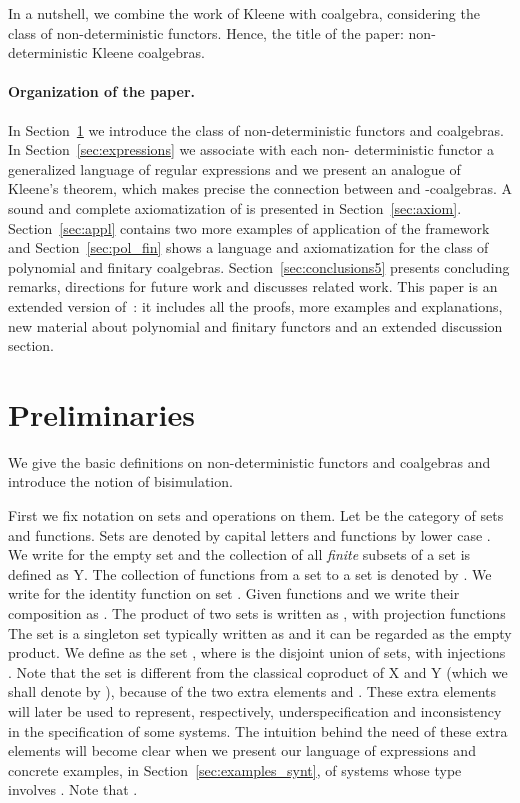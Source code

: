 \documentclass{LMCS}
\def\hyph{-\penalty0\hskip0pt\relax}
\theoremstyle{definition}
\theoremstyle{plain}
\theoremstyle{plain}
\theoremstyle{plain}
\theoremstyle{plain}
\theoremstyle{definition}
\theoremstyle{definition}
\begin{document}
In a nutshell, we combine the work of Kleene
with coalgebra, considering the class of non-deterministic functors.
Hence, the title of the paper: non-deterministic Kleene coalgebras.   

\paragraph{\textbf{Organization of the paper.}} In Section~\ref{sec:ndc} we
introduce the class of non\hyph deterministic functors and coalgebras. In
Section~\ref{sec:expressions} we associate with each non\hyph
deterministic functor  a generalized language  of regular
expressions and we present an analogue of Kleene's theorem, which
makes precise the connection between   and -coalgebras. A
sound and complete axiomatization  of  is presented in
Section~\ref{sec:axiom}. Section~\ref{sec:appl} contains two more
examples of application of the framework and Section~\ref{sec:pol_fin} shows a language
and axiomatization for the class of polynomial and finitary
coalgebras. Section~\ref{sec:conclusions5} presents
concluding remarks, directions for future work and discusses related work. 
This paper is an extended version of~\cite{regexp,BRS09b}: it includes
all the proofs, more examples and explanations, new material about polynomial and finitary functors and an extended discussion section.

\section{Preliminaries} \label{sec:ndc}
We give the basic definitions on non-deterministic functors and coalgebras
and introduce the notion of bisimulation.

\medskip\noindent
First we fix notation on sets and operations on them. Let
 be the category of sets and functions. Sets are
denoted by capital letters  and functions by lower case
. We write  for the empty set and the collection of
all {\em finite} subsets of a set  is defined as
Y. The collection of functions from a set  to a set
 is denoted by . We write  for the identity
function on set . Given functions  and
 we write their composition as . The product
of two sets  is written as , with projection
functions
The set  is a singleton set typically written as  and
it can be regarded as the empty product. We define  as the set
, where  is the disjoint
union of sets, with injections
. Note that the set  is different from the classical
coproduct of X and Y (which we shall denote by ), because of the two extra elements  and
.
These extra elements will later be used to represent, respectively,
underspecification and inconsistency in the specification of some
systems. The intuition behind the
need of these extra elements will become clear when we present our language
of expressions and concrete examples, in
Section~\ref{sec:examples_synt}, of systems whose type
involves . Note that . 
\end{document}
